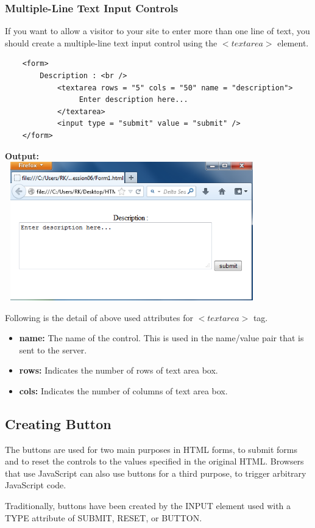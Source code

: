 \documentclass[11pt,a4paper]{article}
\begin{document}
\subsubsection*{Multiple-Line Text Input Controls}
If you want to allow a visitor to your site to enter more than one line of text, you should create a multiple-line text input control using the $<textarea>$ element.
\begin{verbatim}
    <form>
        Description : <br />
            <textarea rows = "5" cols = "50" name = "description">
                 Enter description here...
            </textarea>
            <input type = "submit" value = "submit" />
    </form>
\end{verbatim}
\textbf{Output:}\\
\includegraphics[height = 60mm, width = 110mm]{Form3.png}

Following is the detail of above used attributes for $<textarea>$ tag.
\begin{itemize}
\item \textbf{name:} The name of the control. This is used in the name/value pair that is sent to the server.
\item \textbf{rows:} Indicates the number of rows of text area box.
\item \textbf{cols:} Indicates the number of columns of text area box.
\end{itemize}
\subsection*{Creating Button}
The buttons are used for two main purposes in HTML forms, to submit forms and to reset the controls to the values specified in the original HTML. Browsers that use JavaScript can also use buttons for a third purpose, to trigger arbitrary JavaScript code.

Traditionally, buttons have been created by the INPUT element used with a TYPE attribute of SUBMIT, RESET, or BUTTON.
\end{document}
